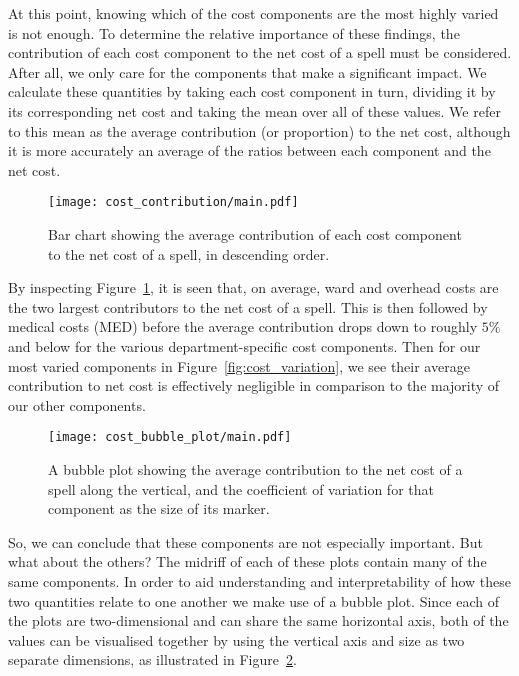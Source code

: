 At this point, knowing which of the cost components are the most highly varied
is not enough. To determine the relative importance of these findings, the
contribution of each cost component to the net cost of a spell must be
considered. After all, we only care for the components that make a significant
impact. We calculate these quantities by taking each cost component in turn,
dividing it by its corresponding net cost and taking the mean over all of these
values. We refer to this mean as the average contribution (or proportion) to the
net cost, although it is more accurately an average of the ratios between each
component and the net cost.

\begin{figure}[h]
    \centering
    \texttt{[image: cost\_contribution/main.pdf]}
    \caption{Bar chart showing the average contribution of each cost component
    to the net cost of a spell, in descending
    order.}\label{fig:cost_contribution}
\end{figure}

By inspecting Figure~\ref{fig:cost_contribution}, it is seen that, on average,
ward and overhead costs are the two largest contributors to the net cost of a
spell. This is then followed by medical costs (MED) before the average
contribution drops down to roughly \(5\%\) and below for the various
department-specific cost components. Then for our most varied components in
Figure~\ref{fig:cost_variation}, we see their average contribution to net cost
is effectively negligible in comparison to the majority of our other components.

\begin{figure}[h]
    \centering
    \texttt{[image: cost\_bubble\_plot/main.pdf]}
    \caption{A bubble plot showing the average contribution to the net cost of a
    spell along the vertical, and the coefficient of variation for that
    component as the size of its marker.}\label{fig:cost_bubble_plot}
\end{figure}

So, we can conclude that these components are not especially important. But what
about the others? The midriff of each of these plots contain many of the same
components. In order to aid understanding and interpretability of how these two
quantities relate to one another we make use of a bubble plot. Since each of the
plots are two-dimensional and can share the same horizontal axis, both of the
values can be visualised together by using the vertical axis and size as two
separate dimensions, as illustrated in Figure~\ref{fig:cost_bubble_plot}.

